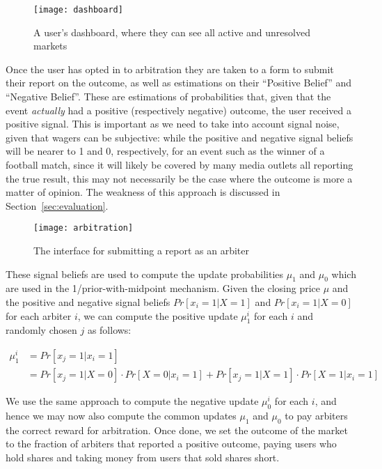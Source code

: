 \documentclass[10pt,a4paper]{article}
\theoremstyle{plain}
\theoremstyle{definition}
\begin{document}
\begin{figure}[h]
	\centering
	\texttt{[image: dashboard]}
	\caption{A user's dashboard, where they can see all active and unresolved
	markets}
	\label{fig:dashboard}
\end{figure}

Once the user has opted in to arbitration they are taken to a form to submit
their report on the outcome, as well as estimations on their ``Positive
Belief'' and ``Negative Belief''. These are estimations of probabilities that,
given that the event \emph{actually} had a positive (respectively negative)
outcome, the user received a positive signal. This is important as we need to
take into account signal noise, given that wagers can be subjective: while the
positive and negative signal beliefs will be nearer to 1 and 0, respectively,
for an event such as the winner of a football match, since it will likely be
covered by many media outlets all reporting the true result, this may not
necessarily be the case where the outcome is more a matter of opinion. The
weakness of this approach is discussed in Section~\ref{sec:evaluation}.

\begin{figure}[h]
	\centering
	\texttt{[image: arbitration]}
	\caption{The interface for submitting a report as an arbiter}
	\label{fig:resolveSecurity}
\end{figure}

These signal beliefs are used to compute the update probabilities $\mu_1$ and
$\mu_0$ which are used in the 1/prior-with-midpoint mechanism. Given the
closing price $\mu$ and the positive and negative signal beliefs
$Pr[x_i=1|X=1]$ and $Pr[x_i=1|X=0]$ for each arbiter $i$, we can compute the
positive update $\mu_1^i$ for each $i$ and randomly chosen $j$ as follows:

\begin{equation}
	\begin{aligned}
		\mu_1^i & = Pr[x_j=1|x_i=1] \\
		& = Pr[x_j=1|X=0] \cdot Pr[X=0|x_i=1] + Pr[x_j=1|X=1] \cdot Pr[X=1|x_i=1]
	\end{aligned}
\end{equation}

We use the same approach to compute the negative update $\mu_0^i$ for each $i$,
and hence we may now also compute the common updates $\mu_1$ and $\mu_0$ to pay
arbiters the correct reward for arbitration. Once done, we set the outcome of
the market to the fraction of arbiters that reported a positive outcome, paying
users who hold shares and taking money from users that sold shares short.
\end{document}
